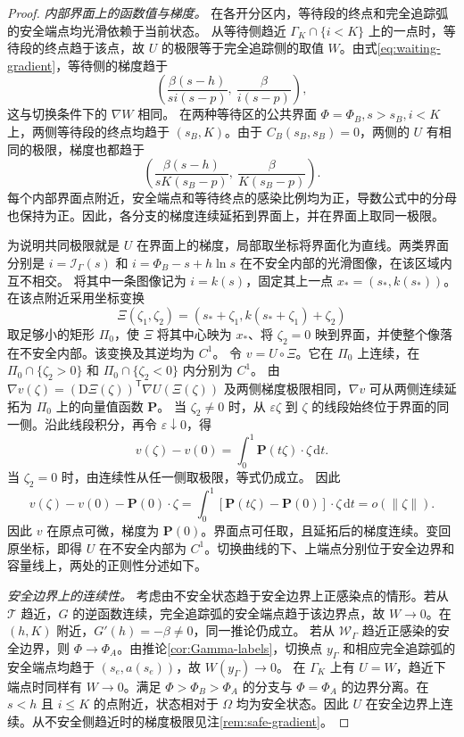 \documentclass[lang=cn,a4paper,newtx]{elegantpaper}
\theoremstyle{plain}
\theoremstyle{definition}
\newcommand{\dd}{\,\mathrm d}
\begin{document}
\begin{proof}
\emph{内部界面上的函数值与梯度。}
在各开分区内，等待段的终点和完全追踪弧的安全端点均光滑依赖于当前状态。
从等待侧趋近 $\Gamma_K\cap\{i<K\}$ 上的一点时，等待段的终点趋于该点，故 $U$ 的极限等于完全追踪侧的取值 $W$。由式\eqref{eq:waiting-gradient}，等待侧的梯度趋于
\[
\left(\frac{\beta(s-h)}{si(s-p)},\ \frac{\beta}{i(s-p)}\right),
\]
这与切换条件下的 $\nabla W$ 相同。
在两种等待区的公共界面 $\Phi=\Phi_B,s>s_B,i<K$ 上，两侧等待段的终点均趋于 $(s_B,K)$。由于 $C_B(s_B,s_B)=0$，两侧的 $U$ 有相同的极限，梯度也都趋于
\[
\left(\frac{\beta(s-h)}{sK(s_B-p)},\ \frac{\beta}{K(s_B-p)}\right).
\]
每个内部界面点附近，安全端点和等待终点的感染比例均为正，导数公式中的分母也保持为正。因此，各分支的梯度连续延拓到界面上，并在界面上取同一极限。

为说明共同极限就是 $U$ 在界面上的梯度，局部取坐标将界面化为直线。两类界面分别是 $i=\mathcal I_\Gamma(s)$ 和 $i=\Phi_B-s+h\ln s$ 在不安全内部的光滑图像，在该区域内互不相交。
将其中一条图像记为 $i=k(s)$，固定其上一点 $x_*=(s_*,k(s_*))$。在该点附近采用坐标变换
\[
\Xi(\zeta_1,\zeta_2)=(s_*+\zeta_1,k(s_*+\zeta_1)+\zeta_2)
\]
取足够小的矩形 $\Pi_0$，使 $\Xi$ 将其中心映为 $x_*$、将 $\zeta_2=0$ 映到界面，并使整个像落在不安全内部。该变换及其逆均为 $C^1$。
令 $v=U\circ\Xi$。它在 $\Pi_0$ 上连续，在 $\Pi_0\cap\{\zeta_2>0\}$ 和 $\Pi_0\cap\{\zeta_2<0\}$ 内分别为 $C^1$。
由 $\nabla v(\zeta)=(\mathrm D\Xi(\zeta))^{\mathsf T}\nabla U(\Xi(\zeta))$ 及两侧梯度极限相同，$\nabla v$ 可从两侧连续延拓为 $\Pi_0$ 上的向量值函数 $\mathbf P$。
当 $\zeta_2\ne0$ 时，从 $\varepsilon\zeta$ 到 $\zeta$ 的线段始终位于界面的同一侧。沿此线段积分，再令 $\varepsilon\downarrow0$，得
\[
v(\zeta)-v(0)=\int_0^1 \mathbf P(t\zeta)\cdot \zeta\dd t.
\]
当 $\zeta_2=0$ 时，由连续性从任一侧取极限，等式仍成立。
因此
\[
v(\zeta)-v(0)-\mathbf P(0)\cdot \zeta
=\int_0^1 [\mathbf P(t\zeta)-\mathbf P(0)]\cdot \zeta\dd t
=o(\lVert \zeta\rVert).
\]
因此 $v$ 在原点可微，梯度为 $\mathbf P(0)$。界面点可任取，且延拓后的梯度连续。变回原坐标，即得 $U$ 在不安全内部为 $C^1$。切换曲线的下、上端点分别位于安全边界和容量线上，两处的正则性分述如下。

\emph{安全边界上的连续性。}
考虑由不安全状态趋于安全边界上正感染点的情形。若从 $\mathcal T$ 趋近，$G$ 的逆函数连续，完全追踪弧的安全端点趋于该边界点，故 $W\to0$。在 $(h,K)$ 附近，$G'(h)=-\beta\ne0$，同一推论仍成立。
若从 $\mathcal W_\Gamma$ 趋近正感染的安全边界，则 $\Phi\to\Phi_A$。由推论\ref{cor:Gamma-labels}，切换点 $y_\Gamma$ 和相应完全追踪弧的安全端点均趋于 $(s_e,a(s_e))$，故 $W(y_\Gamma)\to0$。
在 $\Gamma_K$ 上有 $U=W$，趋近下端点时同样有 $W\to0$。满足 $\Phi>\Phi_B>\Phi_A$ 的分支与 $\Phi=\Phi_A$ 的边界分离。在 $s<h$ 且 $i\le K$ 的点附近，状态相对于 $\Omega$ 均为安全状态。因此 $U$ 在安全边界上连续。从不安全侧趋近时的梯度极限见注\ref{rem:safe-gradient}。


\end{proof}
\end{document}
